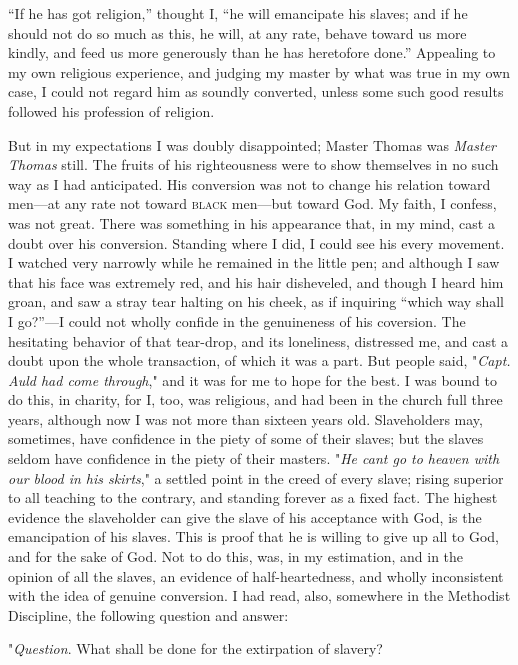 ``If he has got religion,'' thought I, ``he will emancipate his slaves;
and if he should not do so much as this, he will, at any rate, behave
toward us more kindly, and feed us more generously than he has
heretofore done.'' Appealing to my own religious experience, and judging
my master by what was {}true in my own case, I could not regard him as
soundly converted, unless some such good results followed his profession
of religion.

But in my expectations I was doubly disappointed; Master Thomas was
\emph{Master Thomas} still. The fruits of his righteousness were to show
themselves in no such way as I had anticipated. His conversion was not
to change his relation toward men---at any rate not toward
\textsc{black} men---but toward God. My faith, I confess, was not great.
There was something in his appearance that, in my mind, cast a doubt
over his conversion. Standing where I did, I could see his every
movement. I watched very narrowly while he remained in the little pen;
and although I saw that his face was extremely red, and his hair
disheveled, and though I heard him groan, and saw a stray tear halting
on his cheek, as if inquiring ``which way shall I go?''---I could not
wholly confide in the genuineness of his {coversion}. The hesitating
behavior of that tear-drop, and its loneliness, distressed me, and cast
a doubt upon the whole transaction, of which it was a part. But people
said, "\emph{Capt. Auld had come through}," and it was for me to hope
for the best. I was bound to do this, in charity, for I, too, was
religious, and had been in the church full three years, although now I
was not more than sixteen years old. Slaveholders may, sometimes, have
confidence in the piety of some of their slaves; but the slaves seldom
have confidence in the piety of their masters. "\emph{He cant go to
heaven with our blood in his skirts}," a settled point in the creed of
every slave; rising superior to all teaching to the contrary, and
standing {}forever as a fixed fact. The highest evidence the slaveholder
can give the slave of his acceptance with God, is the emancipation of
his slaves. This is proof that he is willing to give up all to God, and
for the sake of God. Not to do this, was, in my estimation, and in the
opinion of all the slaves, an evidence of half-heartedness, and wholly
inconsistent with the idea of genuine conversion. I had read, also,
somewhere in the Methodist Discipline, the following question and
answer:

"\emph{Question}. What shall be done for the extirpation of slavery?


